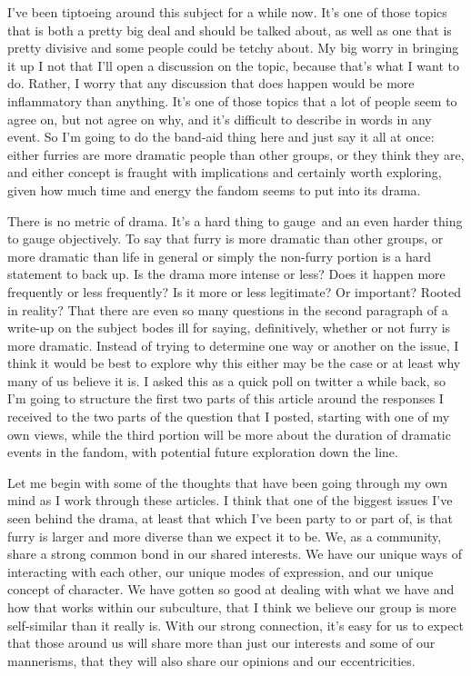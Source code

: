 I've been tiptoeing around this subject for a while now. It's one of
those topics that is both a pretty big deal and should be talked about,
as well as one that is pretty divisive and some people could be tetchy
about. My big worry in bringing it up I not that I'll open a discussion
on the topic, because that's what I want to do. Rather, I worry that any
discussion that does happen would be more inflammatory than anything.
It's one of those topics that a lot of people seem to agree on, but not
agree on why, and it's difficult to describe in words in any event. So
I'm going to do the band-aid thing here and just say it all at once:
either furries are more dramatic people than other groups, or they think
they are, and either concept is fraught with implications and certainly
worth exploring, given how much time and energy the fandom seems to put
into its drama.

There is no metric of drama. It's a hard thing to gauge~and an even
harder thing to gauge objectively. To say that furry is more dramatic
than other groups, or more dramatic than life in general or simply the
non-furry portion is a hard statement to back up. Is the drama more
intense or less? Does it happen more frequently or less frequently? Is
it more or less legitimate? Or important? Rooted in reality? That there
are even so many questions in the second paragraph of a write-up on the
subject bodes ill for saying, definitively, whether or not furry is more
dramatic. Instead of trying to determine one way or another on the
issue, I think it would be best to explore why this either may be the
case or at least why many of us believe it is. I asked this as a quick
poll on twitter a while back, so I'm going to structure the first two
parts of this article around the responses I received to the two parts
of the question that I posted, starting with one of my own views, while
the third portion will be more about the duration of dramatic events in
the fandom, with potential future exploration down the line.

Let me begin with some of the thoughts that have been going through my
own mind as I work through these articles. I think that one of the
biggest issues I've seen behind the drama, at least that which I've been
party to or part of, is that furry is larger and more diverse than we
expect it to be. We, as a community, share a strong common bond in our
shared interests. We have our unique ways of interacting with each
other, our unique modes of expression, and our unique concept of
character. We have gotten so good at dealing with what we have and how
that works within our subculture, that I think we believe our group is
more self-similar than it really is. With our strong connection, it's
easy for us to expect that those around us will share more than just our
interests and some of our mannerisms, that they will also share our
opinions and our eccentricities.

